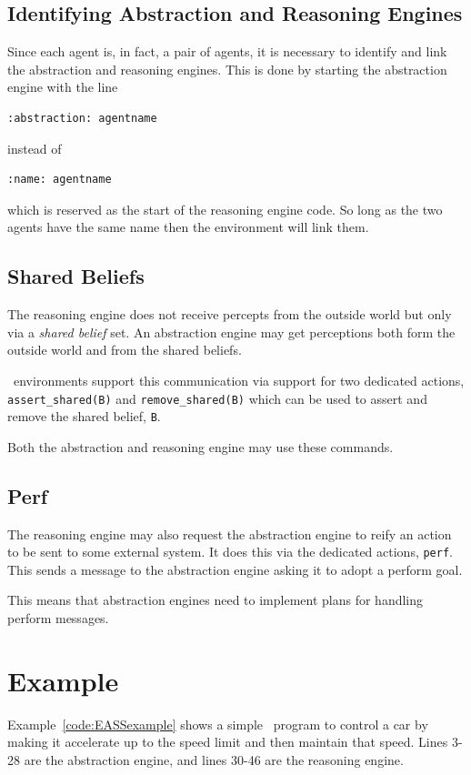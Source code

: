 \subsection{Identifying Abstraction and Reasoning Engines}
Since each agent is, in fact, a pair of agents, it is necessary to identify and link the abstraction and reasoning engines.  This is done by starting the abstraction engine with the line
\begin{verbatim}
:abstraction: agentname
\end{verbatim} 
instead of 
\begin{verbatim}
:name: agentname
\end{verbatim} 
which is reserved as the start of the reasoning engine code.  So long as the two agents have the same name then the environment will link them.

\subsection{Shared Beliefs}
The reasoning engine does not receive percepts from the outside world but only via a \emph{shared belief} set.  An abstraction engine may get perceptions both form the outside world and from the shared beliefs.

\eass\ environments support this communication via support for two dedicated actions, \lstinline{assert_shared(B)} and \lstinline{remove_shared(B)} which can be used to assert and remove the shared belief, \lstinline{B}.

Both the abstraction and reasoning engine may use these commands.

\subsection{Perf}
The reasoning engine may also request the abstraction engine to reify an action to be sent to some external system.  It does this via the dedicated actions, \texttt{perf}.  This sends a message to the abstraction engine asking it to adopt a perform goal.

This means that abstraction engines need to implement plans for handling perform messages.

\section{Example}
Example~\ref{code:EASSexample} shows a simple \eass\ program to control a car by making it accelerate up to the speed limit and then maintain that speed.  Lines 3-28 are the abstraction engine, and lines 30-46 are the reasoning engine.

